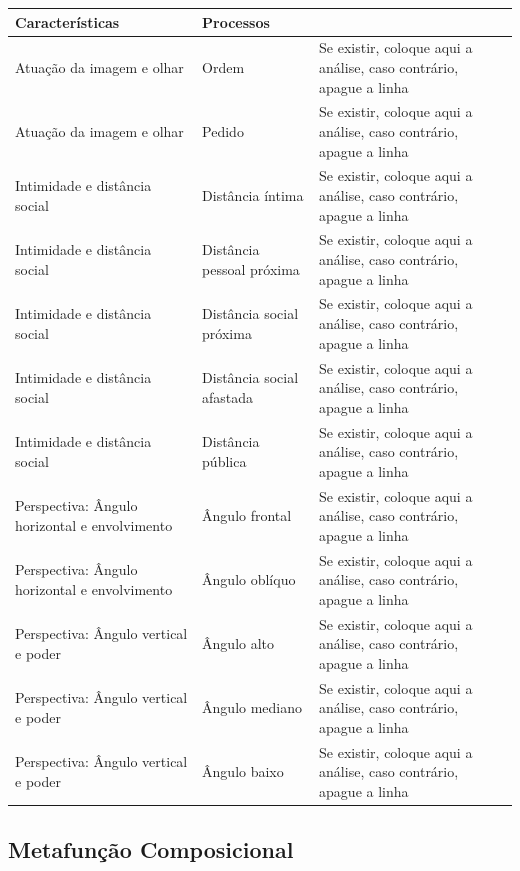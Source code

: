 \documentclass[aspectratio=169]{article}
\begin{document}
\begin{table}[H]
\begin{tabular}{p{} p{} p{}} \hline
Características & Processos \\ \hline \hline
Atuação da imagem e olhar  &  Ordem  &  Se existir, coloque aqui a análise, caso contrário, apague a linha \\ \hline
Atuação da imagem e olhar  &  Pedido  &  Se existir, coloque aqui a análise, caso contrário, apague a linha \\ \hline
Intimidade e distância social  &  Distância íntima  &  Se existir, coloque aqui a análise, caso contrário, apague a linha \\ \hline
Intimidade e distância social  &  Distância pessoal próxima  &  Se existir, coloque aqui a análise, caso contrário, apague a linha \\ \hline
Intimidade e distância social  &  Distância social próxima  &  Se existir, coloque aqui a análise, caso contrário, apague a linha \\ \hline
Intimidade e distância social  &  Distância social afastada  &  Se existir, coloque aqui a análise, caso contrário, apague a linha \\ \hline
Intimidade e distância social  &  Distância pública  &  Se existir, coloque aqui a análise, caso contrário, apague a linha \\ \hline
Perspectiva: Ângulo horizontal e envolvimento &  Ângulo frontal  &  Se existir, coloque aqui a análise, caso contrário, apague a linha \\ \hline
Perspectiva: Ângulo horizontal e envolvimento &  Ângulo oblíquo  &  Se existir, coloque aqui a análise, caso contrário, apague a linha \\ \hline
Perspectiva: Ângulo vertical e poder &  Ângulo alto  &  Se existir, coloque aqui a análise, caso contrário, apague a linha \\ \hline
Perspectiva: Ângulo vertical e poder &  Ângulo mediano  &  Se existir, coloque aqui a análise, caso contrário, apague a linha \\ \hline
Perspectiva: Ângulo vertical e poder &  Ângulo baixo  &  Se existir, coloque aqui a análise, caso contrário, apague a linha \\ \hline
\end{tabular}
\end{table}

\subsection{Metafunção Composicional}
\end{document}
